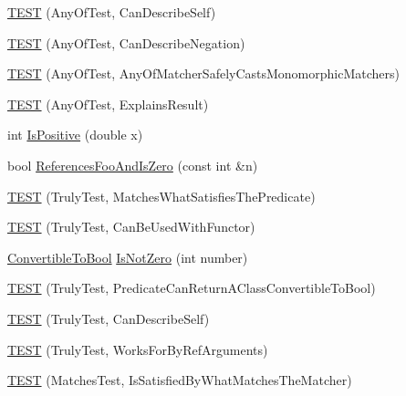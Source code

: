 \begin{DoxyCompactItemize}
\item 
\hyperlink{namespacetesting_1_1gmock__matchers__test_a00bd490bf974b3f3485a1b0fde9fa490}{T\+E\+ST} (Any\+Of\+Test, Can\+Describe\+Self)
\item 
\hyperlink{namespacetesting_1_1gmock__matchers__test_acc5e849e0765f00a48581e9480f3c8e2}{T\+E\+ST} (Any\+Of\+Test, Can\+Describe\+Negation)
\item 
\hyperlink{namespacetesting_1_1gmock__matchers__test_a8fb1598253450afeb0440682cd23999e}{T\+E\+ST} (Any\+Of\+Test, Any\+Of\+Matcher\+Safely\+Casts\+Monomorphic\+Matchers)
\item 
\hyperlink{namespacetesting_1_1gmock__matchers__test_ad4c09014fce6029575e2c337cde85bdf}{T\+E\+ST} (Any\+Of\+Test, Explains\+Result)
\item 
int \hyperlink{namespacetesting_1_1gmock__matchers__test_a70e728cf67d0224c3ebb9eb8959cc39d}{Is\+Positive} (double x)
\item 
bool \hyperlink{namespacetesting_1_1gmock__matchers__test_abdce9daf2e3d3721d68f76680129f03b}{References\+Foo\+And\+Is\+Zero} (const int \&n)
\item 
\hyperlink{namespacetesting_1_1gmock__matchers__test_ab7761562a8ffea67a485f3f649f6430a}{T\+E\+ST} (Truly\+Test, Matches\+What\+Satisfies\+The\+Predicate)
\item 
\hyperlink{namespacetesting_1_1gmock__matchers__test_ab3e259f3ae45e199474d7c6d554852f0}{T\+E\+ST} (Truly\+Test, Can\+Be\+Used\+With\+Functor)
\item 
\hyperlink{classtesting_1_1gmock__matchers__test_1_1_convertible_to_bool}{Convertible\+To\+Bool} \hyperlink{namespacetesting_1_1gmock__matchers__test_a248045bc57c8bad87b7d185b5c292f60}{Is\+Not\+Zero} (int number)
\item 
\hyperlink{namespacetesting_1_1gmock__matchers__test_a24529fd7834d272009af74106422fe54}{T\+E\+ST} (Truly\+Test, Predicate\+Can\+Return\+A\+Class\+Convertible\+To\+Bool)
\item 
\hyperlink{namespacetesting_1_1gmock__matchers__test_af474a9719e614d521c71bdf7c39f6a7a}{T\+E\+ST} (Truly\+Test, Can\+Describe\+Self)
\item 
\hyperlink{namespacetesting_1_1gmock__matchers__test_ae702d436c52bd37fe3e8d405d7e6a691}{T\+E\+ST} (Truly\+Test, Works\+For\+By\+Ref\+Arguments)
\item 
\hyperlink{namespacetesting_1_1gmock__matchers__test_a6617484cbb644af9882fc5d853112aae}{T\+E\+ST} (Matches\+Test, Is\+Satisfied\+By\+What\+Matches\+The\+Matcher)
\item 

\end{DoxyCompactItemize}
